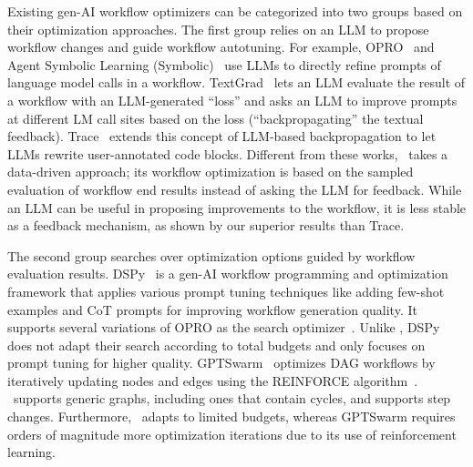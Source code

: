 Existing gen-AI workflow optimizers can be categorized into two groups based on their optimization approaches.
The first group relies on an LLM to propose workflow changes and guide workflow autotuning.
For example, OPRO~\cite{opro} and Agent Symbolic Learning (Symbolic)~\cite{symbolic} use LLMs to directly refine prompts of language model calls in a workflow. TextGrad~\cite{textgrad} lets an LLM evaluate the result of a workflow with an LLM-generated ``loss'' and asks an LLM to improve prompts at different LM call sites based on the loss (``backpropagating'' the textual feedback). Trace~\cite{Trace} extends this concept of LLM-based backpropagation to let LLMs rewrite user-annotated code blocks. Different from these works, \sysname\ takes a data-driven approach; its workflow optimization is based on the sampled evaluation of workflow end results instead of asking the LLM for feedback. While an LLM can be useful in proposing improvements to the workflow, it is less stable as a feedback mechanism, as shown by our superior results than Trace. 

The second group searches over optimization options guided by workflow evaluation results.
DSPy~\cite{khattab2024dspy,dspy-2-2024,DSPy-repo} is a gen-AI workflow programming and optimization framework that applies various prompt tuning techniques like adding few-shot examples and CoT prompts for improving workflow generation quality. It supports several variations of OPRO as the search optimizer~\cite{dspy-2-2024}. Unlike \sysname, DSPy does not adapt their search according to total budgets and only focuses on prompt tuning for higher quality. GPTSwarm~\cite{gptswarm} optimizes DAG workflows by iteratively updating nodes and edges using the REINFORCE algorithm~\cite{reinforce}. \sysname\ supports generic graphs, including ones that contain cycles, and supports step changes. Furthermore, \sysname\ adapts to limited budgets, whereas GPTSwarm requires orders of magnitude more optimization iterations due to its use of reinforcement learning. 

